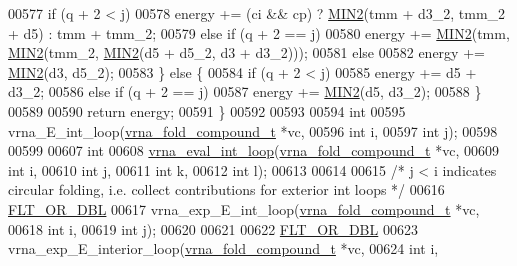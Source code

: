 \begin{DoxyCode}
00577     \textcolor{keywordflow}{if} (q + 2 < j)
00578       energy += (ci && cp) ? \hyperlink{group__utils_gae0b9cd0ce090bd69b951aa73e8fa4f7d}{MIN2}(tmm + d3\_2, tmm\_2 + d5) : tmm + tmm\_2;
00579     \textcolor{keywordflow}{else} \textcolor{keywordflow}{if} (q + 2 == j)
00580       energy += \hyperlink{group__utils_gae0b9cd0ce090bd69b951aa73e8fa4f7d}{MIN2}(tmm, \hyperlink{group__utils_gae0b9cd0ce090bd69b951aa73e8fa4f7d}{MIN2}(tmm\_2, \hyperlink{group__utils_gae0b9cd0ce090bd69b951aa73e8fa4f7d}{MIN2}(d5 + d5\_2, d3 + d3\_2)));
00581     \textcolor{keywordflow}{else}
00582       energy += \hyperlink{group__utils_gae0b9cd0ce090bd69b951aa73e8fa4f7d}{MIN2}(d3, d5\_2);
00583   \} \textcolor{keywordflow}{else} \{
00584     \textcolor{keywordflow}{if} (q + 2 < j)
00585       energy += d5 + d3\_2;
00586     \textcolor{keywordflow}{else} \textcolor{keywordflow}{if} (q + 2 == j)
00587       energy += \hyperlink{group__utils_gae0b9cd0ce090bd69b951aa73e8fa4f7d}{MIN2}(d5, d3\_2);
00588   \}
00589 
00590   \textcolor{keywordflow}{return} energy;
00591 \}
00592 
00593 
00594 \textcolor{keywordtype}{int}
00595 vrna\_E\_int\_loop(\hyperlink{group__fold__compound_structvrna__fc__s}{vrna\_fold\_compound\_t}  *vc,
00596                 \textcolor{keywordtype}{int}                   i,
00597                 \textcolor{keywordtype}{int}                   j);
00598 
00599 
00607 \textcolor{keywordtype}{int}
00608 \hyperlink{group__loops_ga018f1314dbbae42fdd27c94670b61721}{vrna\_eval\_int\_loop}(\hyperlink{group__fold__compound_structvrna__fc__s}{vrna\_fold\_compound\_t} *vc,
00609                    \textcolor{keywordtype}{int}                  i,
00610                    \textcolor{keywordtype}{int}                  j,
00611                    \textcolor{keywordtype}{int}                  k,
00612                    \textcolor{keywordtype}{int}                  l);
00613 
00614 
00615 \textcolor{comment}{/* j < i indicates circular folding, i.e. collect contributions for exterior int loops */}
00616 \hyperlink{group__data__structures_ga31125aeace516926bf7f251f759b6126}{FLT\_OR\_DBL}
00617 vrna\_exp\_E\_int\_loop(\hyperlink{group__fold__compound_structvrna__fc__s}{vrna\_fold\_compound\_t}  *vc,
00618                     \textcolor{keywordtype}{int}                   i,
00619                     \textcolor{keywordtype}{int}                   j);
00620 
00621 
00622 \hyperlink{group__data__structures_ga31125aeace516926bf7f251f759b6126}{FLT\_OR\_DBL}
00623 vrna\_exp\_E\_interior\_loop(\hyperlink{group__fold__compound_structvrna__fc__s}{vrna\_fold\_compound\_t} *vc,
00624                          \textcolor{keywordtype}{int}                  i,

\end{DoxyCode}
